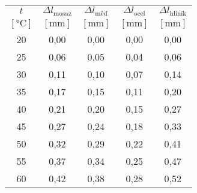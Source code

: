\begin{tabular}{ccccc}																															\toprule
$t$					&	$\Delta l_{\text{mosaz}}$	&	$\Delta l_{\text{měď}}$	&	$\Delta l_{\text{ocel}}$&	$\Delta l_{\text{hliník}}$	\\
$[\si{\celsius}]$	&	$[\si{\milli\metre}]$		&	$[\si{\milli\metre}]$	&	$[\si{\milli\metre}]$	&	$[\si{\milli\metre}]$		\\	\midrule
20					&	0,00						&	0,00					&	0,00					&	0,00						\\
25					&	0,06						&	0,05					&	0,04					&	0,06						\\
30					&	0,11						&	0,10					&	0,07					&	0,14						\\
35					&	0,17						&	0,15					&	0,11					&	0,20						\\
40					&	0,21						&	0,20					&	0,15					&	0,27						\\
45					&	0,27						&	0,24					&	0,18					&	0,33						\\
50					&	0,32						&	0,29					&	0,22					&	0,41						\\
55					&	0,37						&	0,34					&	0,25					&	0,47						\\
60					&	0,42						&	0,38					&	0,28					&	0,52						\\	\bottomrule

\end{tabular}